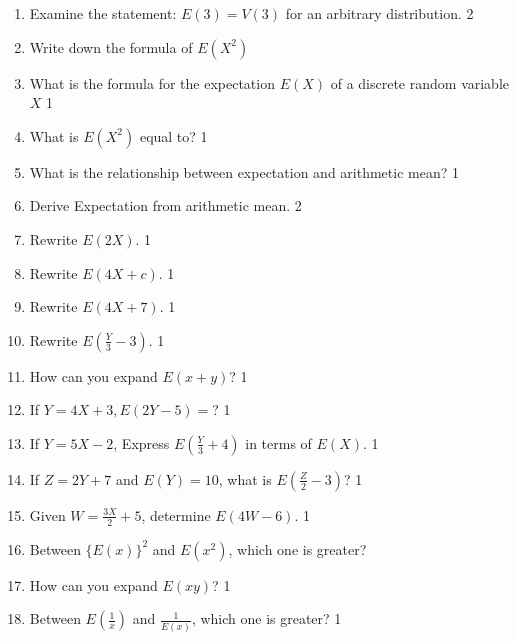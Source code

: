 \documentclass[a4paper,oneside, margin=1.4in]{book}
\begin{document}
\begin{enumerate}

  \item Examine the statement: $E(3) = V(3)$ for an arbitrary distribution. \hfill 2

  \item Write down the formula of $E(X^2)$

\item What is the formula for the expectation \( E(X) \) of a discrete random variable \( X \) \hfill 1

\item What is $E(X^2)$ equal to? \hfill 1

\item What is the relationship between expectation and arithmetic mean?  \hfill 1

\item Derive Expectation from arithmetic mean.  \hfill 2

\item Rewrite $E(2X)$.  \hfill 1

\item Rewrite $E(4X + c)$.  \hfill 1

\item Rewrite $E(4X + 7)$.  \hfill 1

\item Rewrite $E(\frac Y3 - 3)$.  \hfill 1

\item How can you expand $E(x+y)$? \hfill 1

\item If $Y = 4X + 3, E(2Y-5)=?$ \hfill 1

\item If $Y = 5X - 2$, Express $E\left(\frac{Y}{3} + 4\right)$ in terms of $E(X)$. \hfill 1

\item If $Z = 2Y + 7$ and $E(Y) = 10$, what is $E\left(\frac{Z}{2} - 3\right)$? \hfill 1

\item Given $W = \frac{3X}{2} + 5$, determine $E(4W - 6)$. \hfill 1

\item Between $\{E(x)\}^2$ and $E(x^2)$, which one is greater?

\item How can you expand $E(xy)$? \hfill 1

\item Between $\displaystyle E\left(\frac{1}{x}\right)$ and $\displaystyle \frac 1{E(x)}$, which one is greater? \hfill 1


\end{enumerate}
\end{document}
